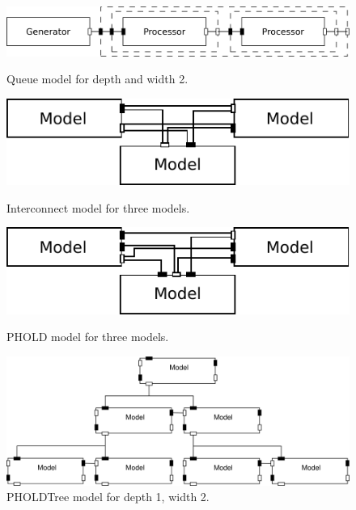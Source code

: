 \begin{figure}
	\center
	\includegraphics[width=\columnwidth]{fig/queue_model_fixed.pdf}
	\caption{Queue model for depth and width 2.}
	\label{fig:queue_model}
	
	\vspace{\betweenmodels}
	
	\includegraphics[width=\modelfraction\columnwidth]{fig/interconnect_model.pdf}
	\caption{Interconnect model for three models.}
	\label{fig:interconnect_model}
	
	\vspace{\betweenmodels}
	
	\includegraphics[width=\modelfraction\columnwidth]{fig/phold_model.pdf}
	\caption{PHOLD model for three models.}
	\label{fig:PHOLD_model}
	
	\includegraphics[width=\modelfraction\columnwidth]{fig/pholdtree.pdf}
	\caption{PHOLDTree model for depth 1, width 2.}
	\label{fig:PHOLDTree_model}
\end{figure}